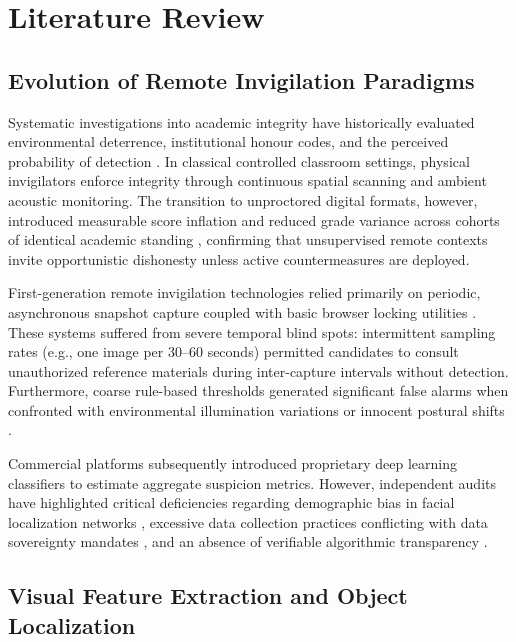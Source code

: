 \renewcommand{\baselinestretch}{1.5}\normalsize
\chapter{Literature Review}

\section{Evolution of Remote Invigilation Paradigms}

Systematic investigations into academic integrity have historically evaluated environmental deterrence, institutional honour codes, and the perceived probability of detection \cite{mccabe1993, watson2010}. In classical controlled classroom settings, physical invigilators enforce integrity through continuous spatial scanning and ambient acoustic monitoring. The transition to unproctored digital formats, however, introduced measurable score inflation and reduced grade variance across cohorts of identical academic standing \cite{daffin2018}, confirming that unsupervised remote contexts invite opportunistic dishonesty unless active countermeasures are deployed.

First-generation remote invigilation technologies relied primarily on periodic, asynchronous snapshot capture coupled with basic browser locking utilities \cite{viola2001}. These systems suffered from severe temporal blind spots: intermittent sampling rates (e.g., one image per 30--60 seconds) permitted candidates to consult unauthorized reference materials during inter-capture intervals without detection. Furthermore, coarse rule-based thresholds generated significant false alarms when confronted with environmental illumination variations or innocent postural shifts \cite{proctoru2020}.

Commercial platforms subsequently introduced proprietary deep learning classifiers to estimate aggregate suspicion metrics. However, independent audits have highlighted critical deficiencies regarding demographic bias in facial localization networks \cite{facialrecogbias2021}, excessive data collection practices conflicting with data sovereignty mandates \cite{eff2020}, and an absence of verifiable algorithmic transparency \cite{coghlan2021}.

\section{Visual Feature Extraction and Object Localization}

